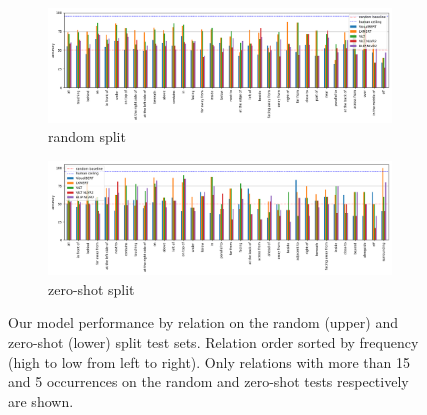\begin{figure}[ht]
    \centering
\begin{subfigure}[b]{\linewidth}
    \centering
    \includegraphics[width=\linewidth]{images/visual-spatial-reasoning/performance_rel_random.png}
    \vspace{-1cm}
    \caption{random split}
\end{subfigure}
\begin{subfigure}[b]{\linewidth}
    \centering
    \includegraphics[width=\linewidth]{images/visual-spatial-reasoning/performance_rel_zeroshot.png}
    \vspace{-1cm}
    \caption{zero-shot split}
\end{subfigure}
\caption{Our model performance by relation on the random (upper) and zero-shot (lower) split test sets. Relation order sorted by frequency (high to low from left to right). Only relations with more than 15 and 5 occurrences on the random and zero-shot tests respectively are shown. }
    \label{fig:performance_by_rel}
\end{figure}

